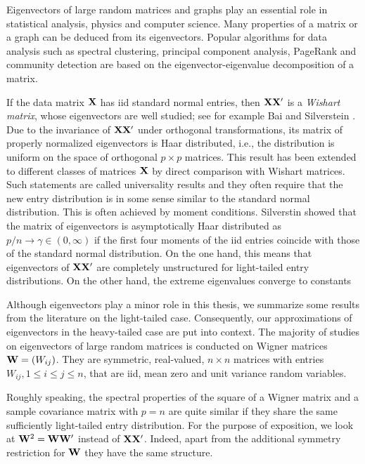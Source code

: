 Eigenvectors of large random matrices and graphs play an essential role in statistical analysis, physics and computer science. Many properties of a matrix or a graph can be deduced from its eigenvectors. Popular algorithms for data analysis such as spectral clustering, principal component analysis, PageRank and community detection are based on the eigenvector-eigenvalue decomposition of a matrix.

If the data matrix ${\mathbf X}$ has iid standard normal entries, then ${\mathbf X}{\mathbf X}'$ is a {\em Wishart matrix}, whose eigenvectors are well studied; see for example Bai and Silverstein \cite[Ch.~10]{bai:silverstein:2010}. Due to the invariance of ${\mathbf X}{\mathbf X}'$ under orthogonal transformations, its matrix of properly normalized eigenvectors is Haar distributed, i.e., the distribution is uniform on the space of orthogonal $p\times p$ matrices. This result has been extended to different classes of matrices ${\mathbf X}$ by direct comparison with Wishart matrices. Such statements are called universality results and they often require that the new entry distribution is in some sense similar to the standard normal distribution. This is often achieved by moment conditions. Silverstin \cite{silverstein:1984} showed that the matrix of eigenvectors is asymptotically Haar distributed as $p/n\to \gamma\in(0,\infty)$ if the first four moments of the iid entries coincide with those of the standard normal distribution. On the one hand, this means that eigenvectors of ${\mathbf X}{\mathbf X}'$ are completely unstructured for light-tailed entry distributions.  On the other hand, the extreme eigenvalues converge to constants \as 
\par

Although eigenvectors play a minor role in this thesis, we summarize some results from the literature on the light-tailed case.  Consequently, our approximations of eigenvectors in the heavy-tailed case are put into context. The majority of studies on eigenvectors of large random matrices is conducted on Wigner matrices ${\mathbf W}=(W_{ij})$. They are symmetric, real-valued, $n\times n$ matrices with entries $W_{ij}, 1\le i \le j \le n$, that are iid, mean zero and unit variance random variables. 

Roughly speaking, the spectral properties of the square of a Wigner matrix and a sample covariance matrix with $p=n$ are quite similar if they share the same sufficiently light-tailed entry distribution. For the purpose of exposition, we look at ${\mathbf W}^2={\mathbf W} {\mathbf W}'$ instead of ${\mathbf X}{\mathbf X}'$. Indeed, apart from the additional symmetry restriction for ${\mathbf W}$ they have the same structure. 

